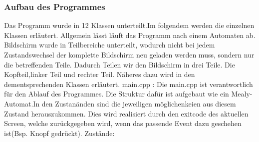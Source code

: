 \documentclass[11pt,a4paper]{article} %
\begin{document}
\par
\subsubsection{Aufbau des Programmes}
Das Programm wurde in 12 Klassen unterteilt.Im folgendem werden die einzelnen Klassen erläutert.
Allgemein lässt läuft das Programm nach einem Automaten ab. Bildschirm wurde in Teilbereiche unterteilt, wodurch nicht bei jedem Zustandswechsel der komplette Bildschirm neu geladen werden muss, sondern nur die betreffenden Teile.
Dadurch Teilen wir den Bildschirm in drei Teile. Die Kopfteil,linker Teil und rechter Teil. Näheres dazu wird in den dementsprechenden Klassen erläutert.
main.cpp :
	Die main.cpp ist verantwortlich für den Ablauf des Programmes. Die Struktur dafür ist aufgebaut wie ein Mealy-Automat.In den Zustanänden sind die jeweiligen möglichenkeien aus diesem Zustand herauszukommen.
	Dies wird realisiert durch den exitcode des aktuellen Screen, welche zurückgegeben wird, wenn das passende Event dazu geschehen ist(Bsp. Knopf gedrückt).
	Zustände:
\end{document}
